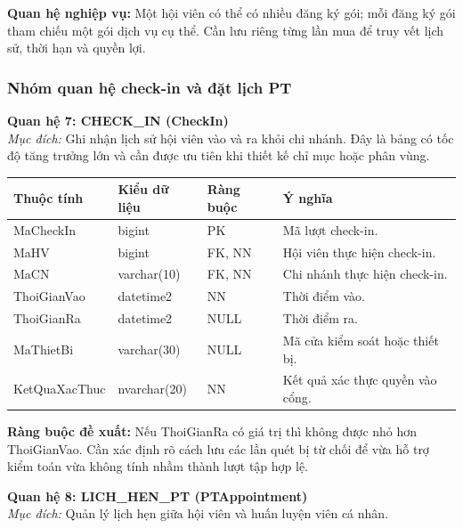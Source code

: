 \documentclass[11pt, a4paper]{article}
\begin{document}
\textbf{Quan hệ nghiệp vụ:} Một hội viên có thể có nhiều đăng ký gói; mỗi đăng ký gói tham chiếu một gói dịch vụ cụ thể. Cần lưu riêng từng lần mua để truy vết lịch sử, thời hạn và quyền lợi.

\subsubsection{Nhóm quan hệ check-in và đặt lịch PT}

\textbf{Quan hệ 7: CHECK\_IN (CheckIn)} \\
\textit{Mục đích:} Ghi nhận lịch sử hội viên vào và ra khỏi chi nhánh. Đây là bảng có tốc độ tăng trưởng lớn và cần được ưu tiên khi thiết kế chỉ mục hoặc phân vùng.

\begin{small}
\begin{tabularx}{\textwidth}{| C{2.8cm} | C{2.4cm} | C{2.2cm} | Y |}
\hline
\textbf{Thuộc tính} & \textbf{Kiểu dữ liệu} & \textbf{Ràng buộc} & \textbf{Ý nghĩa} \\
\hline
MaCheckIn & bigint & PK & Mã lượt check-in. \\
\hline
MaHV & bigint & FK, NN & Hội viên thực hiện check-in. \\
\hline
MaCN & varchar(10) & FK, NN & Chi nhánh thực hiện check-in. \\
\hline
ThoiGianVao & datetime2 & NN & Thời điểm vào. \\
\hline
ThoiGianRa & datetime2 & NULL & Thời điểm ra. \\
\hline
MaThietBi & varchar(30) & NULL & Mã cửa kiểm soát hoặc thiết bị. \\
\hline
KetQuaXacThuc & nvarchar(20) & NN & Kết quả xác thực quyền vào cổng. \\
\hline
\end{tabularx}
\end{small}

\textbf{Ràng buộc đề xuất:} Nếu ThoiGianRa có giá trị thì không được nhỏ hơn ThoiGianVao. Cần xác định rõ cách lưu các lần quét bị từ chối để vừa hỗ trợ kiểm toán vừa không tính nhầm thành lượt tập hợp lệ.

\vspace{0.8em}
\textbf{Quan hệ 8: LICH\_HEN\_PT (PTAppointment)} \\
\textit{Mục đích:} Quản lý lịch hẹn giữa hội viên và huấn luyện viên cá nhân.
\end{document}
